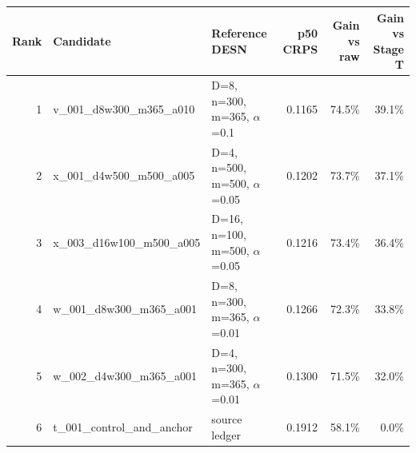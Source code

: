 \small
\begin{tabular}{rllrrr}
\toprule
Rank & Candidate & Reference DESN & p50 CRPS & Gain vs raw & Gain vs Stage T \\
\midrule
1 & v\_001\_d8w300\_m365\_a010 & D=8, n=300, m=365, $\alpha$=0.1 & 0.1165 & 74.5\% & 39.1\% \\
2 & x\_001\_d4w500\_m500\_a005 & D=4, n=500, m=500, $\alpha$=0.05 & 0.1202 & 73.7\% & 37.1\% \\
3 & x\_003\_d16w100\_m500\_a005 & D=16, n=100, m=500, $\alpha$=0.05 & 0.1216 & 73.4\% & 36.4\% \\
4 & w\_001\_d8w300\_m365\_a001 & D=8, n=300, m=365, $\alpha$=0.01 & 0.1266 & 72.3\% & 33.8\% \\
5 & w\_002\_d4w300\_m365\_a001 & D=4, n=300, m=365, $\alpha$=0.01 & 0.1300 & 71.5\% & 32.0\% \\
6 & t\_001\_control\_and\_anchor & source ledger & 0.1912 & 58.1\% & 0.0\% \\
\bottomrule
\end{tabular}
